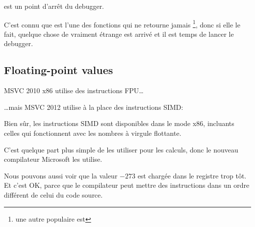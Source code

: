  est un point d'arrêt du debugger.

C'est connu que  est l'une des fonctions qui ne retourne jamais
\footnote{une autre populaire est },
donc si elle le fait, quelque chose de vraiment étrange est arrivé et il est temps de lancer le debugger.

\subsection{Floating-point values}



MSVC 2010 x86 utilise des instructions \ac{FPU}\dots



\dots mais MSVC 2012 utilise à la place des instructions \ac{SIMD}:



Bien sûr, les instructions \ac{SIMD} sont disponibles dans le mode x86,
incluants celles qui fonctionnent avec les nombres à virgule flottante.

C'est quelque part plus simple de les utiliser pour les calculs, donc le nouveau compilateur Microsoft les utilise.

Nous pouvons aussi voir que la valeur $-273$
est chargée dans le registre  trop tôt.
Et c'est OK, parce que le compilateur peut mettre des instructions dans un ordre
différent de celui du code source.
